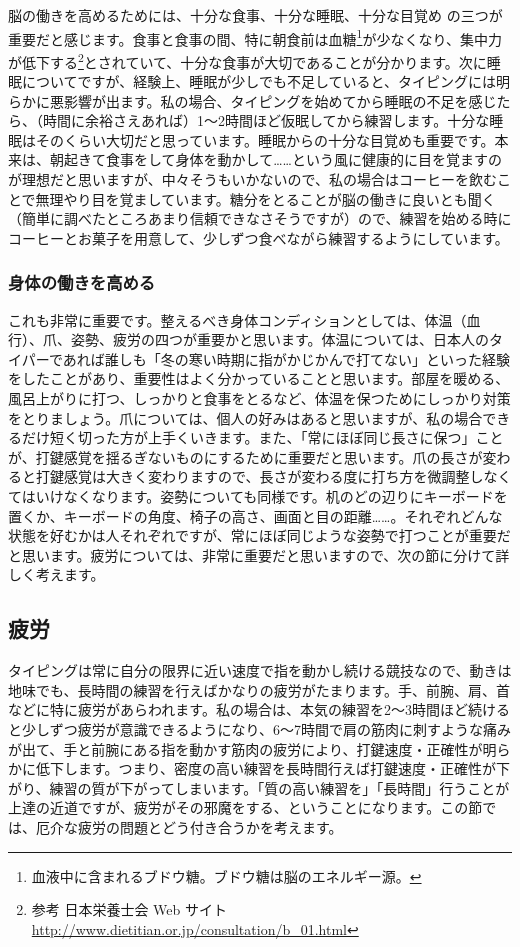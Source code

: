 脳の働きを高めるためには、十分な食事、十分な睡眠、十分な目覚め の三つが重要だと感じます。食事と食事の間、特に朝食前は血糖\footnote{血液中に含まれるブドウ糖。ブドウ糖は脳のエネルギー源。}が少なくなり、集中力が低下する\footnote{参考 日本栄養士会 Web サイト\url{http://www.dietitian.or.jp/consultation/b\_01.html}}とされていて、十分な食事が大切であることが分かります。次に睡眠についてですが、経験上、睡眠が少しでも不足していると、タイピングには明らかに悪影響が出ます。私の場合、タイピングを始めてから睡眠の不足を感じたら、（時間に余裕さえあれば）1～2時間ほど仮眠してから練習します。十分な睡眠はそのくらい大切だと思っています。睡眠からの十分な目覚めも重要です。本来は、朝起きて食事をして身体を動かして……という風に健康的に目を覚ますのが理想だと思いますが、中々そうもいかないので、私の場合はコーヒーを飲むことで無理やり目を覚ましています。糖分をとることが脳の働きに良いとも聞く（簡単に調べたところあまり信頼できなさそうですが）ので、練習を始める時にコーヒーとお菓子を用意して、少しずつ食べながら練習するようにしています。

\subsubsection*{身体の働きを高める}

これも非常に重要です。整えるべき身体コンディションとしては、体温（血行）、爪、姿勢、疲労の四つが重要かと思います。体温については、日本人のタイパーであれば誰しも「冬の寒い時期に指がかじかんで打てない」といった経験をしたことがあり、重要性はよく分かっていることと思います。部屋を暖める、風呂上がりに打つ、しっかりと食事をとるなど、体温を保つためにしっかり対策をとりましょう。爪については、個人の好みはあると思いますが、私の場合できるだけ短く切った方が上手くいきます。また、「常にほぼ同じ長さに保つ」ことが、打鍵感覚を揺るぎないものにするために重要だと思います。爪の長さが変わると打鍵感覚は大きく変わりますので、長さが変わる度に打ち方を微調整しなくてはいけなくなります。姿勢についても同様です。机のどの辺りにキーボードを置くか、キーボードの角度、椅子の高さ、画面と目の距離……。それぞれどんな状態を好むかは人それぞれですが、常にほぼ同じような姿勢で打つことが重要だと思います。疲労については、非常に重要だと思いますので、次の節に分けて詳しく考えます。

\subsection{疲労}

タイピングは常に自分の限界に近い速度で指を動かし続ける競技なので、動きは地味でも、長時間の練習を行えばかなりの疲労がたまります。手、前腕、肩、首などに特に疲労があらわれます。私の場合は、本気の練習を2～3時間ほど続けると少しずつ疲労が意識できるようになり、6～7時間で肩の筋肉に刺すような痛みが出て、手と前腕にある指を動かす筋肉の疲労により、打鍵速度・正確性が明らかに低下します。つまり、密度の高い練習を長時間行えば打鍵速度・正確性が下がり、練習の質が下がってしまいます。「質の高い練習を」「長時間」行うことが上達の近道ですが、疲労がその邪魔をする、ということになります。この節では、厄介な疲労の問題とどう付き合うかを考えます。

